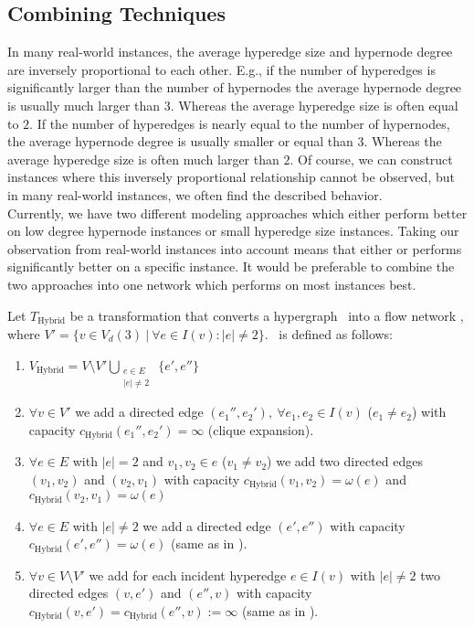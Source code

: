 \subsection{Combining Techniques}
\label{sec:hybrid_network}

In many real-world instances, the average hyperedge size and hypernode degree are inversely
proportional to each other. E.g., if the number of hyperedges is significantly larger than the
number of hypernodes the average hypernode degree is usually much larger than $3$. Whereas
the average hyperedge size is often equal to $2$. If the number of hyperedges is nearly equal
to the number of hypernodes, the average hypernode degree is usually smaller or equal than $3$. Whereas
the average hyperedge size is often much larger than $2$. Of course, we can construct instances
where this inversely proportional relationship cannot be observed, but in many real-world instances,
we often find the described behavior. \\
Currently, we have two different modeling approaches which either perform better on low degree
hypernode instances or small hyperedge size instances. Taking our observation from real-world instances 
into account means that either  or  performs significantly better on
a specific instance. It would be preferable to combine the two approaches into one network 
which performs on most instances best. \\

\begin{definition}
Let $T_{\text{Hybrid}}$ be a transformation that converts a hypergraph \HypergraphDef~into 
a flow network \Hybrid, where $V' = \{v \in V_d(3)\ |\ \forall e \in I(v): |e| \neq 2\}$. 
\ShortHybrid~is defined as follows:
\begin{enumerate}
\item $V_{\text{Hybrid}} = V\setminus V' \bigcup\limits_{\substack{e \in E \\ |e| \neq 2}}\ \{e', e''\}$
\item $\forall v \in V'$ we add a directed edge $(e_1'', e_2'),\ \forall e_1, e_2 \in I(v)$ 
      ($e_1 \neq e_2$) with capacity $c_{\text{Hybrid}}(e_1'', e_2') = \infty$ (clique expansion).
\item $\forall e \in E$ with $|e| = 2$ and $v_1,v_2 \in e$ ($v_1 \neq v_2$) we add 
      two directed edges $(v_1,v_2)$ and $(v_2,v_1)$ with capacity $c_{\text{Hybrid}}(v_1,v_2) = \omega(e)$
      and $c_{\text{Hybrid}}(v_2,v_1) = \omega(e)$
\item $\forall e \in E$ with $|e| \neq 2$ we add a directed edge $(e',e'')$
      with capacity $c_{\text{Hybrid}}(e',e'') = \omega(e)$ (same as in ).
\item $\forall v \in V\setminus V'$ we add for each incident hyperedge $e \in I(v)$ with $|e| \neq 2$ 
      two directed edges $(v,e')$ and $(e'',v)$ with capacity 
      $c_{\text{Hybrid}}(v,e') = c_{\text{Hybrid}}(e'',v) := \infty$ (same as in ).
\end{enumerate} 
\end{definition}


